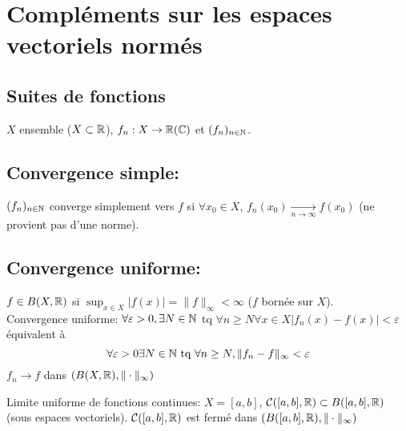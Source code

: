 \section{Compléments sur les espaces vectoriels normés}
\subsection{Suites de fonctions}
$X$ ensemble ($X \subset \mathbb{R}$), $f_n: X \to \mathbb{R}(\mathbb{C})$ et $(f_n)_{n \in \mathbb{N}}$.
\subsection{Convergence simple: }
\begin{definition}
    $(f_n)_{n \in \mathbb{N}}$ converge simplement vers $f$ si  $\forall x_0 \in X$, $f_n(x_0) \xrightarrow[n \to \infty]{} f(x_0)$ (ne provient pas d'une norme).
\end{definition}
\subsection{Convergence uniforme: }
\begin{definition}
    $f \in B(X, \mathbb{R})$ si $\sup_{x \in X} |f(x)| = \|f\|_{\infty} < \infty$ ($f$ bornée sur  $X$). \\
    Convergence uniforme: $\forall \varepsilon > 0, \exists N \in \mathbb{N}$ tq $\forall n \ge N \forall x \in X |f_n(x) - f(x)| < \varepsilon$ équivalent à
    \[
    \forall \varepsilon > 0 \exists N \in \mathbb{N} \text{ tq } \forall n \ge N, \|f_n - f\|_{\infty} < \varepsilon
    \] 
    $f_n \to f$ dans $(B(X, \mathbb{R}), \| \cdot \|_{\infty})$
\end{definition}
\begin{definition}
    Limite uniforme de fonctions continues: $X = [a, b]$,  $\mathcal{C}([a, b], \mathbb{R}) \subset B([a, b], \mathbb{R})$(sous espaces vectoriels). $\mathcal{C}([a, b], \mathbb{R})$ est fermé dans $(B([a, b], \mathbb{R}), \| \cdot \|_{\infty})$
\end{definition}
